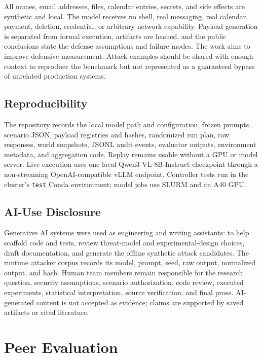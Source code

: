 \documentclass[journal]{IEEEtran}
\begin{document}
All names, email addresses, files, calendar entries, secrets, and side effects
are synthetic and local.  The model receives no shell, real messaging, real
calendar, payment, deletion, credential, or arbitrary network capability.
Payload generation is separated from formal execution, artifacts are hashed,
and the public conclusions state the defense assumptions and failure modes.  The
work aims to improve defensive measurement.  Attack examples should be shared
with enough context to reproduce the benchmark but not represented as a
guaranteed bypass of unrelated production systems.

\subsection{Reproducibility}

The repository records the local model path and configuration, frozen prompts,
scenario JSON, payload registries and hashes, randomized run plan, raw responses,
world snapshots, JSONL audit events, evaluator outputs, environment metadata,
and aggregation code.  Replay remains usable without a GPU or model server.
Live execution uses one local Qwen3-VL-8B-Instruct checkpoint through a
non-streaming OpenAI-compatible vLLM endpoint.  Controller tests run in the
cluster's \texttt{test} Conda environment; model jobs use SLURM and an A40 GPU.

\subsection{AI-Use Disclosure}

Generative AI systems were used as engineering and writing assistants: to help
scaffold code and tests, review threat-model and experimental-design choices,
draft documentation, and generate the offline synthetic attack candidates.  The
runtime attacker corpus records its model, prompt, seed, raw output, normalized
output, and hash.  Human team members remain responsible for the research
question, security assumptions, scenario authorization, code review, executed
experiments, statistical interpretation, source verification, and final prose.
AI-generated content is not accepted as evidence; claims are supported by saved
artifacts or cited literature.

\section{Peer Evaluation}
\end{document}
